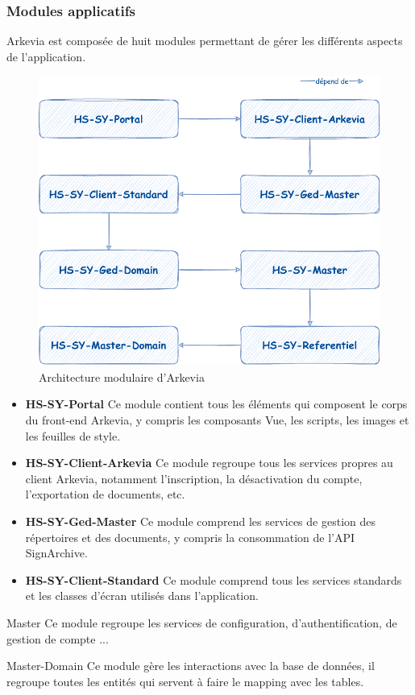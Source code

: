 \subsubsection{Modules applicatifs}
Arkevia est composée de huit modules permettant de gérer les différents aspects de l'application.
\begin{figure}[H]
    \begin{center}
        \includegraphics[width=0.56\linewidth]{images/sec2/modules-arkevia.pdf}
        \caption{Architecture modulaire d'Arkevia}
        \label{fig:modules_arkevia}
    \end{center}
\end{figure}
\begin{itemize}
    \item \textbf{HS-SY-Portal}
    Ce module contient tous les éléments qui composent le corps du front-end Arkevia, y compris les composants Vue, les scripts, les images et les feuilles de style.
    \item \textbf{HS-SY-Client-Arkevia}
    Ce module regroupe tous les services propres au client Arkevia, notamment l'inscription, la désactivation du compte, l'exportation de documents, etc.
    \item \textbf{HS-SY-Ged-Master}
    Ce module comprend les services de gestion des répertoires et des documents, y compris la consommation de l'API SignArchive.
    \item \textbf{HS-SY-Client-Standard}
    Ce module comprend tous les services standards et les classes d'écran utilisés dans l'application.
\end{itemize}
Master
Ce module regroupe les services de configuration, d'authentification, de gestion de compte ...

Master-Domain
Ce module gère les interactions avec la base de données, il regroupe toutes les entités qui servent à faire le mapping avec les tables.

